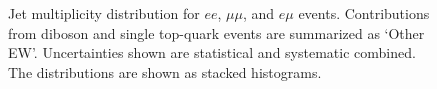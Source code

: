 \begin{figure}[htbp]
  \begin{center}
    \caption{ Jet multiplicity distribution for $ee$, $\mu\mu$, and $e\mu$ events.
      Contributions from diboson and single top-quark events are summarized as `Other EW'.
      Uncertainties shown are statistical and systematic combined.
      The distributions are shown as stacked histograms.}
    \label{f:ll_met_ht}
  \end{center}
\end{figure}

